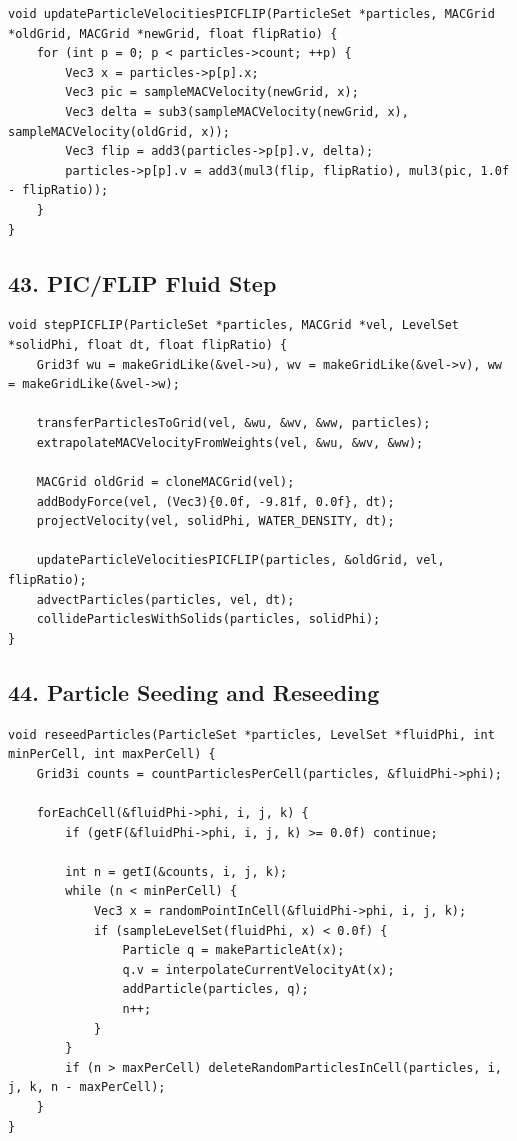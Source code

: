 \documentclass[10pt,letterpaper]{article}
\begin{document}
\begin{verbatim}
void updateParticleVelocitiesPICFLIP(ParticleSet *particles, MACGrid *oldGrid, MACGrid *newGrid, float flipRatio) {
    for (int p = 0; p < particles->count; ++p) {
        Vec3 x = particles->p[p].x;
        Vec3 pic = sampleMACVelocity(newGrid, x);
        Vec3 delta = sub3(sampleMACVelocity(newGrid, x), sampleMACVelocity(oldGrid, x));
        Vec3 flip = add3(particles->p[p].v, delta);
        particles->p[p].v = add3(mul3(flip, flipRatio), mul3(pic, 1.0f - flipRatio));
    }
}
\end{verbatim}

\subsection*{43. PIC/FLIP Fluid Step}

\begin{verbatim}
void stepPICFLIP(ParticleSet *particles, MACGrid *vel, LevelSet *solidPhi, float dt, float flipRatio) {
    Grid3f wu = makeGridLike(&vel->u), wv = makeGridLike(&vel->v), ww = makeGridLike(&vel->w);

    transferParticlesToGrid(vel, &wu, &wv, &ww, particles);
    extrapolateMACVelocityFromWeights(vel, &wu, &wv, &ww);

    MACGrid oldGrid = cloneMACGrid(vel);
    addBodyForce(vel, (Vec3){0.0f, -9.81f, 0.0f}, dt);
    projectVelocity(vel, solidPhi, WATER_DENSITY, dt);

    updateParticleVelocitiesPICFLIP(particles, &oldGrid, vel, flipRatio);
    advectParticles(particles, vel, dt);
    collideParticlesWithSolids(particles, solidPhi);
}
\end{verbatim}

\subsection*{44. Particle Seeding and Reseeding}

\begin{verbatim}
void reseedParticles(ParticleSet *particles, LevelSet *fluidPhi, int minPerCell, int maxPerCell) {
    Grid3i counts = countParticlesPerCell(particles, &fluidPhi->phi);

    forEachCell(&fluidPhi->phi, i, j, k) {
        if (getF(&fluidPhi->phi, i, j, k) >= 0.0f) continue;

        int n = getI(&counts, i, j, k);
        while (n < minPerCell) {
            Vec3 x = randomPointInCell(&fluidPhi->phi, i, j, k);
            if (sampleLevelSet(fluidPhi, x) < 0.0f) {
                Particle q = makeParticleAt(x);
                q.v = interpolateCurrentVelocityAt(x);
                addParticle(particles, q);
                n++;
            }
        }
        if (n > maxPerCell) deleteRandomParticlesInCell(particles, i, j, k, n - maxPerCell);
    }
}
\end{verbatim}
\end{document}
